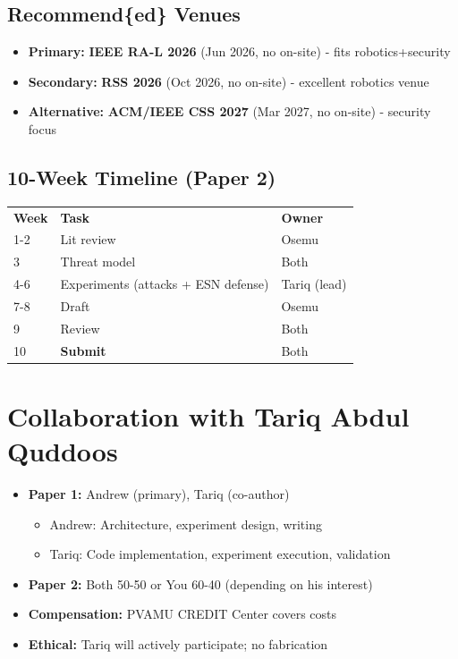 \documentclass[conference]{IEEEtran}
\begin{document}
\subsection{Recommend\{ed\} Venues}
\begin{itemize}
    \item \textbf{Primary:} \textbf{IEEE RA-L 2026} (Jun 2026, no on-site) - fits robotics+security
    \item \textbf{Secondary:} \textbf{RSS 2026} (Oct 2026, no on-site) - excellent robotics venue
    \item \textbf{Alternative:} \textbf{ACM/IEEE CSS 2027} (Mar 2027, no on-site) - security focus
\end{itemize}

\subsection{10-Week Timeline (Paper 2)}
\begin{tabular}{lll}
\textbf{Week} & \textbf{Task} & \textbf{Owner} \\
1-2 & Lit review & Osemu \\
3 & Threat model & Both \\
4-6 & Experiments (attacks + ESN defense) & Tariq (lead) \\
7-8 & Draft & Osemu \\
9 & Review & Both \\
10 & \textbf{Submit} & Both \\
\end{tabular}

\section{Collaboration with Tariq Abdul Quddoos}

\begin{itemize}
    \item \textbf{Paper 1:} Andrew (primary), Tariq (co-author)
    \begin{itemize}
        \item Andrew: Architecture, experiment design, writing
        \item Tariq: Code implementation, experiment execution, validation
    \end{itemize}
    \item \textbf{Paper 2:} Both 50-50 or You 60-40 (depending on his interest)
    \item \textbf{Compensation:} PVAMU CREDIT Center covers costs
    \item \textbf{Ethical:} Tariq will actively participate; no fabrication
\end{itemize}
\end{document}
